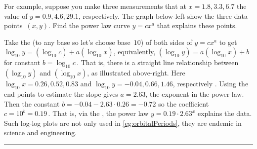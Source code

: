 \begin{table}
\begin{minipage}{\linewidth}
For example, suppose you make three measurements that at $x=1.8,3.3,6.7$ the value of $y=0.9,4.6,29.1$, respectively.  
The graph below-left show the three data points~$(x,y)$.  
Find the power law curve $y=cx^a$ that explains these points.
\begin{center} 
 \hfil
{} 
\end{center}
Take the  (to any base so let's choose base~$10$) of both sides of $y=cx^a$ to get $\log_{10} y=(\log_{10} c)+a(\log_{10} x)$, equivalently, $(\log_{10} y)=a(\log_{10} x)+b$ for constant $b=\log_{10} c$\,.
That is, there is a straight line relationship between $(\log_{10} y)$ and $(\log_{10} x)$, as illustrated above-right.
Here $\log_{10}x=0.26,0.52,0.83$ and $\log_{10}y=-0.04,0.66,1.46$, respectively \twodp.
Using the end points to estimate the slope gives $a=2.63$, the exponent in the power law.
Then the constant $b=-0.04-2.63\cdot0.26=-0.72$ so the coefficient $c=10^b=0.19$\,.
That is, via the , the power law $y=0.19\cdot 2.63^x$ explains the data.
Such log-log plots are not only used in \autoref{eg:orbitalPeriods}, they are endemic in science and engineering.
\end{minipage}
\hrule
\end{table}




